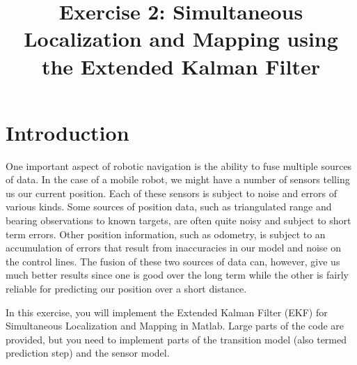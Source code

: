 \documentclass[a4, 10pt]{article}
\title{Exercise 2: Simultaneous Localization and Mapping using the
  Extended Kalman Filter}
\begin{document}
\maketitle

\section{Introduction}
One important aspect of robotic navigation is the ability to fuse
multiple sources of data. In the case of a mobile robot, we might have
a number of sensors telling us our current position. Each of these
sensors is subject to noise and errors of various kinds. Some sources
of position data, such as triangulated range and bearing observations
to known targets, are often quite noisy and subject to short term
errors. Other position information, such as odometry, is subject
to an accumulation of errors that result from inaccuracies in our
model and noise on the control lines. The fusion of these two sources
of data can, however, give us much better results since one is good
over the long term while the other is fairly reliable for predicting
our position over a short distance.

In this exercise, you will implement the Extended Kalman Filter (EKF)
for Simultaneous Localization and Mapping in Matlab.  Large parts of the code
are provided, but you need to implement parts of the transition model
(also termed prediction step) and the sensor model.


%
%
%
\end{document}
